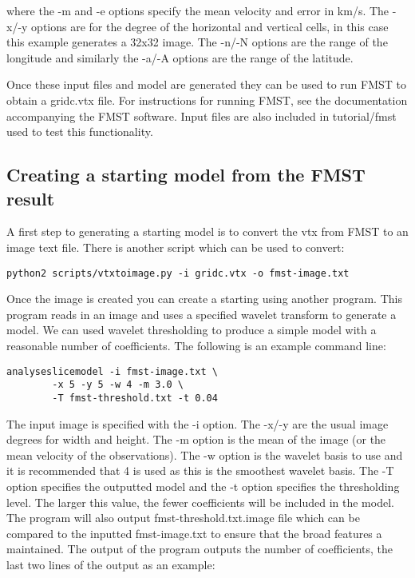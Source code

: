 \documentclass[a4paper,12pt]{article}
\begin{document}
where the -m and -e options specify the mean velocity and
error in km/s. The -x/-y options are for the degree of the horizontal
and vertical cells, in this case this example generates a 32x32 image.
The -n/-N options are the range of the longitude
and similarly the -a/-A options are the range of the latitude.

Once these input files and model are generated they can be used
to run FMST to obtain a gridc.vtx file. For instructions for running
FMST, see the documentation accompanying the FMST software.
Input files are also included in tutorial/fmst used to
test this functionality.

\subsection{Creating a starting model from the FMST result}

A first step to generating a starting model is to convert the vtx
from FMST to an image text file. There is another script
which can be used to convert:

\begin{verbatim}
python2 scripts/vtxtoimage.py -i gridc.vtx -o fmst-image.txt
\end{verbatim}

Once the image is created you can create a starting using another
program. This program reads in an image and uses a specified
wavelet transform to generate a model. We can used wavelet
thresholding to produce a simple model with a reasonable number
of coefficients. The following is an example command line:

\begin{verbatim}
analyseslicemodel -i fmst-image.txt \
        -x 5 -y 5 -w 4 -m 3.0 \
        -T fmst-threshold.txt -t 0.04
\end{verbatim}

The input image is specified with the -i option. The -x/-y
are the usual image degrees for width and height. The
-m option is the mean of the image (or the mean velocity
of the observations). The -w option is the wavelet basis
to use and it is recommended that 4 is used as this is the
smoothest wavelet basis. The -T option specifies the outputted
model and the -t option specifies the thresholding level.
The larger this value, the fewer coefficients will be
included in the model. The program will also output
fmst-threshold.txt.image file which can be compared to the
inputted fmst-image.txt to ensure that the broad features
a maintained. The output of the program outputs
the number of coefficients, the last two lines of the output
as an example:
\end{document}

